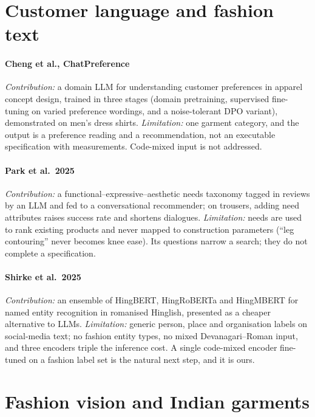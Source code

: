 \section{Customer language and fashion text}

\paragraph{Cheng et al., ChatPreference \cite{cheng2026chatpref}} \emph{Contribution:} a domain LLM for understanding customer preferences in apparel concept design, trained in three stages (domain pretraining, supervised fine-tuning on varied preference wordings, and a noise-tolerant DPO variant), demonstrated on men's dress shirts. \emph{Limitation:} one garment category, and the output is a preference reading and a recommendation, not an executable specification with measurements. Code-mixed input is not addressed.

\paragraph{Park et al.\ 2025 \cite{park2025fea}} \emph{Contribution:} a functional--expressive--aesthetic needs taxonomy tagged in reviews by an LLM and fed to a conversational recommender; on trousers, adding need attributes raises success rate and shortens dialogues. \emph{Limitation:} needs are used to rank existing products and never mapped to construction parameters (``leg contouring'' never becomes knee ease). Its questions narrow a search; they do not complete a specification.

\paragraph{Shirke et al.\ 2025 \cite{shirke2025hinglish}} \emph{Contribution:} an ensemble of HingBERT, HingRoBERTa and HingMBERT for named entity recognition in romanised Hinglish, presented as a cheaper alternative to LLMs. \emph{Limitation:} generic person, place and organisation labels on social-media text; no fashion entity types, no mixed Devanagari--Roman input, and three encoders triple the inference cost. A single code-mixed encoder fine-tuned on a fashion label set is the natural next step, and it is ours.

\section{Fashion vision and Indian garments}

